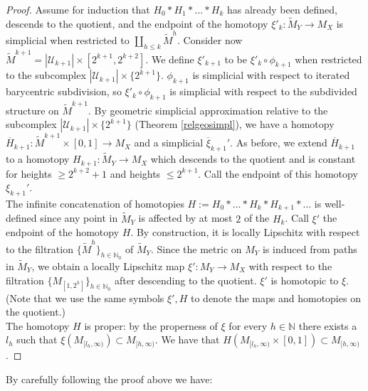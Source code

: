 \documentclass[a4paper,11pt]{article}
\theoremstyle{definition}
\theoremstyle{plain}
\theoremstyle{remark}
\begin{document}
{\begin{proof}
Assume for induction that $H_{0}\ast H_{1}\ast \dots \ast H_{k}$ has already been defined, descends to the quotient, and the endpoint of the homotopy $\xi'_{k}: \tilde{M}_{Y} \rightarrow M_{X}$ is simplicial when restricted to $\coprod_{h\leq k} \tilde{M}^{h}$. Consider now $\tilde{M}^{k+1} = |\mathcal{U}_{k+1}| \times [2^{k+1},2^{k+2}]$. We define $\xi'_{k+1}$ to be $\xi'_{k}\circ \phi_{k+1}$ when restricted to the subcomplex $|\mathcal{U}_{k+1}| \times \{2^{k+1}\}$. $\phi_{k+1}$ is simplicial with respect to iterated barycentric subdivision, so $\xi'_{k}\circ \phi_{k+1}$ is simplicial with respect to the subdivided structure on $\tilde{M}^{k+1}$. By geometric simplicial approximation relative to the subcomplex $|\mathcal{U}_{k+1}| \times \{2^{k+1}\}$ (Theorem \ref{relgeosimpl}), we have a homotopy $\overline{H}_{k+1}: \tilde{M}^{k+1} \times [0,1]\rightarrow M_{X}$ and a simplicial $\overline{\xi}_{k+1}'$. As before, we extend $\overline{H}_{k+1}$ to a homotopy $H_{k+1}: \tilde{M}_{Y}\rightarrow M_{X}$ which descends to the quotient and is constant for heights $\geq 2^{k+2} +1$ and heights $\leq 2^{k+1}$. Call the endpoint of this homotopy ${\xi}_{k+1}'$.\\

The infinite concatenation of homotopies $H:= H_{0}\ast \dots \ast H_{k}\ast H_{k+1}\ast \dots$ is well-defined since any point in $\tilde{M}_{Y}$ is affected by at most $2$ of the $H_{k}$. Call $\xi'$ the endpoint of the homotopy $H$. By construction, it is locally Lipschitz with respect to the filtration $\{\tilde{M}^h\}_{h\in \mathbb{N}_{0}}$ of $\tilde{M}_{Y}$.  Since the metric on $M_{Y}$ is induced from paths in $\tilde{M}_{Y}$, we obtain a locally Lipschitz map $\xi':M_{Y}\rightarrow M_{X}$ with respect to the filtration $\{M_{[1,2^h]}\}_{h\in \mathbb{N}_{0}}$ after descending to the quotient. $\xi'$ is homotopic to $\xi$. (Note that we use the same symbols $\xi',H$ to denote the maps and homotopies on the quotient.) \\

The homotopy $H$ is proper: by the properness of $\xi$ for every $h\in \mathbb{N}$ there exists a $l_{h}$ such that $\xi(M_{[l_{h},\infty)})\subset M_{[h,\infty)}$. We have that $H(M_{[l_{h},\infty)}\times [0,1])\subset M_{[h,\infty)}$. 
\end{proof}

By carefully following the proof above we have:

}
\end{document}
